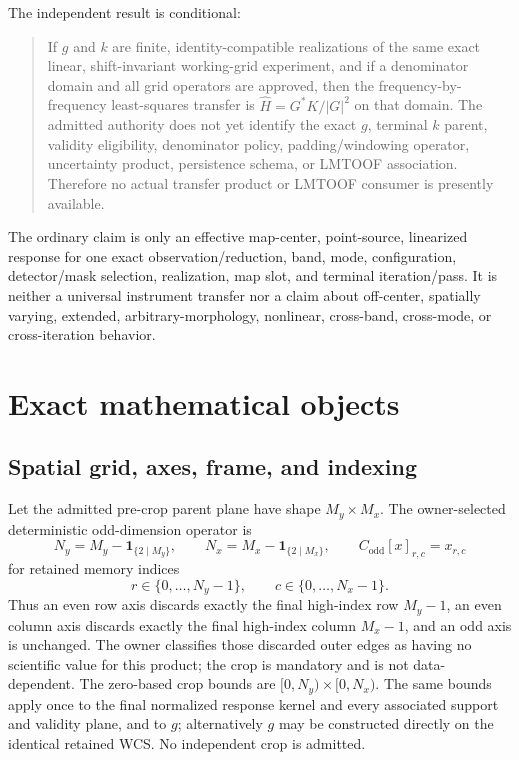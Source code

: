 \documentclass[11pt]{article}
\newcommand{\ind}{\mathbf{1}}
\begin{document}
The independent result is conditional:

\begin{quote}
If $g$ and $k$ are finite, identity-compatible realizations of the same exact
linear, shift-invariant working-grid experiment, and if a denominator domain
and all grid operators are approved, then the frequency-by-frequency
least-squares transfer is $\widehat H=G^*K/|G|^2$ on that domain.  The admitted
authority does not yet identify the exact $g$, terminal $k$ parent, validity
eligibility, denominator policy, padding/windowing operator, uncertainty
product, persistence schema, or LMTOOF association.  Therefore no actual
transfer product or LMTOOF consumer is presently available.
\end{quote}

The ordinary claim is only an effective map-center, point-source,
linearized response for one exact observation/reduction, band, mode,
configuration, detector/mask selection, realization, map slot, and terminal
iteration/pass.  It is neither a universal instrument transfer nor a claim
about off-center, spatially varying, extended, arbitrary-morphology, nonlinear,
cross-band, cross-mode, or cross-iteration behavior.

\section{Exact mathematical objects}

\subsection{Spatial grid, axes, frame, and indexing}

Let the admitted pre-crop parent plane have shape $M_y\times M_x$.  The
owner-selected deterministic odd-dimension operator is
\[
 N_y=M_y-\ind_{\{2\mid M_y\}},\qquad
 N_x=M_x-\ind_{\{2\mid M_x\}},
 \qquad
 C_{\mathrm{odd}}[x]_{r,c}=x_{r,c}
\]
for retained memory indices
\[
 r\in\{0,\ldots,N_y-1\},\qquad c\in\{0,\ldots,N_x-1\}.
\]
Thus an even row axis discards exactly the final high-index row $M_y-1$, an
even column axis discards exactly the final high-index column $M_x-1$, and an
odd axis is unchanged.  The owner classifies those discarded outer edges as
having no scientific value for this product; the crop is mandatory and is not
data-dependent.  The zero-based crop bounds are
$[0,N_y)\times[0,N_x)$.  The same bounds apply once to the final normalized
response kernel and every associated support and validity plane, and to $g$;
alternatively $g$ may be constructed directly on the identical retained WCS.
No independent crop is admitted.
\end{document}
